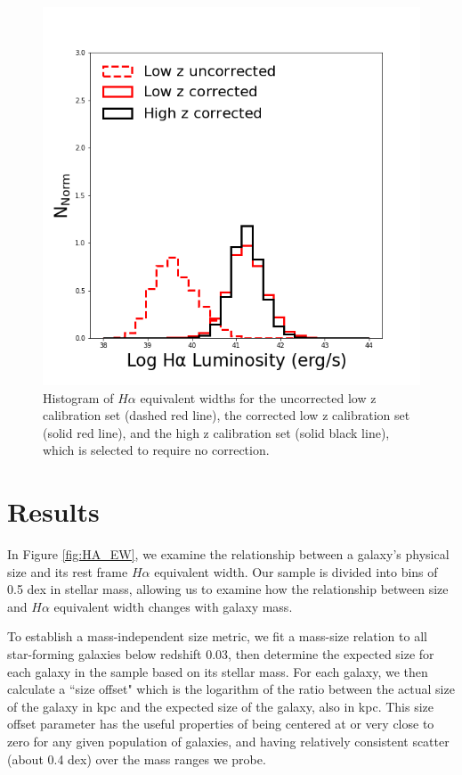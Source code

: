 \documentclass[iop]{emulateapj}
\begin{document}
\begin{figure}
	\centering
	\includegraphics[width=1 \columnwidth]{hist_9_5.png}
	\caption{Histogram of $H\alpha$ equivalent widths for the uncorrected low z calibration set (dashed red line), the corrected low z calibration set (solid red line), and the high z calibration set (solid black line), which is selected to require no correction.}
     \label{fig:hist}

\end{figure}



\section{Results}
\label{sec:results}

In Figure \ref{fig:HA_EW}, we examine the relationship between a galaxy's physical size and its rest frame $H\alpha$ equivalent width. Our sample is divided into bins of 0.5 dex in stellar mass, allowing us to examine how the relationship between size and $H\alpha$ equivalent width changes with galaxy mass.

To establish a mass-independent size metric, we fit a mass-size relation to all star-forming galaxies below redshift 0.03, then determine the expected size for each galaxy in the sample based on its stellar mass. For each galaxy, we then calculate a ``size offset" which is the logarithm of the ratio between the actual size of the galaxy in kpc and the expected size of the galaxy, also in kpc. This size offset parameter has the useful properties of being centered at or very close to zero for any given population of galaxies, and having relatively consistent scatter (about 0.4 dex) over the mass ranges we probe.
\end{document}
